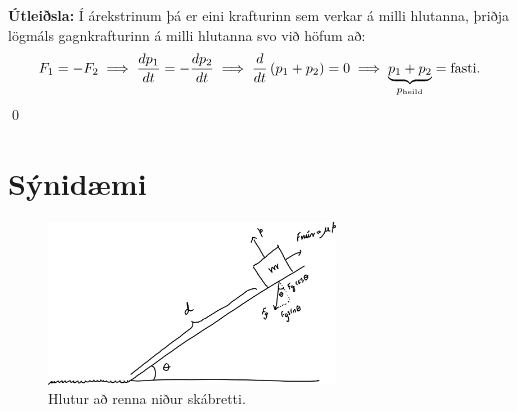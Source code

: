 \ifdefined \wholebook \else\documentclass[oneside]{book}\usepackage{EdlBook}\graphicspath{{figures/}}
\begin{document}
\textbf{Útleiðsla:} Í árekstrinum þá er eini krafturinn sem verkar á milli hlutanna, þriðja lögmáls gagnkrafturinn á milli hlutanna svo við höfum að:
\begin{align*}
    F_{1} = -F_{2} \implies \frac{dp_1}{dt} = -\frac{dp_2}{dt} \implies \frac{d}{dt}\left( p_1 + p_2 \right) = 0 \implies \underbrace{p_1 + p_2}_\textrm{$p_{\text{heild}}$} = \text{fasti}.
\end{align*}
\qed

\section{Sýnidæmi}


\begin{minipage}{\linewidth}
\begin{figure}
\vspace{-1cm}
\includegraphics[width=3in]{temp/fnun.pdf}
\caption{Hlutur að renna niður skábretti.}
\label{fig:fnun}
\end{figure}


\end{minipage}
\end{document}
